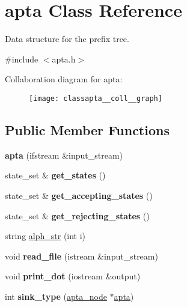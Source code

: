 \hypertarget{classapta}{}\section{apta Class Reference}
\label{classapta}


Data structure for the prefix tree.  




{\ttfamily \#include $<$apta.\+h$>$}



Collaboration diagram for apta\+:\nopagebreak
\begin{figure}[H]
\begin{center}
\leavevmode
\texttt{[image: classapta\_\_coll\_\_graph]}
\end{center}
\end{figure}
\subsection*{Public Member Functions}
\begin{DoxyCompactItemize}
\item 
{\bfseries apta} (ifstream \&input\+\_\+stream)\hypertarget{classapta_ac73a92ff14388c87804623895ce116da}{}\label{classapta_ac73a92ff14388c87804623895ce116da}

\item 
state\+\_\+set \& {\bfseries get\+\_\+states} ()\hypertarget{classapta_a70f18be1f59c6b937b4a7e503a38e1c9}{}\label{classapta_a70f18be1f59c6b937b4a7e503a38e1c9}

\item 
state\+\_\+set \& {\bfseries get\+\_\+accepting\+\_\+states} ()\hypertarget{classapta_a8df053716928abf6d31dd05de70061af}{}\label{classapta_a8df053716928abf6d31dd05de70061af}

\item 
state\+\_\+set \& {\bfseries get\+\_\+rejecting\+\_\+states} ()\hypertarget{classapta_a18483d0e28f3bde60006a541d1fd42cd}{}\label{classapta_a18483d0e28f3bde60006a541d1fd42cd}

\item 
string \hyperlink{classapta_a244ffcaf3ff27062eec5463d26033ac8}{alph\+\_\+str} (int i)
\item 
void {\bfseries read\+\_\+file} (istream \&input\+\_\+stream)\hypertarget{classapta_aba445f4073c6358d699f523f6f8890b3}{}\label{classapta_aba445f4073c6358d699f523f6f8890b3}

\item 
void {\bfseries print\+\_\+dot} (iostream \&output)\hypertarget{classapta_ac882456f8a38ed04e27763f25580975f}{}\label{classapta_ac882456f8a38ed04e27763f25580975f}

\item 
int {\bfseries sink\+\_\+type} (\hyperlink{classapta__node}{apta\+\_\+node} $\ast$\hyperlink{classapta}{apta})\hypertarget{classapta_a81486fd0903cbc20ada8a3e326266de5}{}\label{classapta_a81486fd0903cbc20ada8a3e326266de5}

\end{DoxyCompactItemize}
